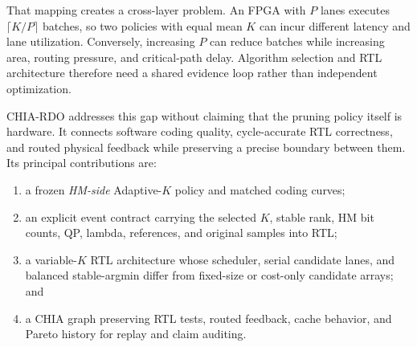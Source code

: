 \documentclass[journal]{IEEEtran}
\newcommand{\project}{\textsc{CHIA-RDO}\xspace}
\begin{document}
That mapping creates a cross-layer problem. An FPGA with $P$ lanes executes
$\lceil K/P\rceil$ batches, so two policies with equal mean $K$ can incur
different latency and lane utilization. Conversely, increasing $P$ can reduce
batches while increasing area, routing pressure, and critical-path delay.
Algorithm selection and RTL architecture therefore need a shared evidence loop
rather than independent optimization.

\project addresses this gap without claiming that the pruning policy itself is
hardware. It connects software coding quality, cycle-accurate RTL correctness,
and routed physical feedback while preserving a precise boundary between them.
Its principal contributions are:
\begin{enumerate}
  \item a frozen \emph{HM-side} Adaptive-$K$ policy and matched coding curves;
  \item an explicit event contract carrying the selected $K$, stable rank,
        HM bit counts, QP, lambda, references, and original samples into RTL;
  \item a variable-$K$ RTL architecture whose scheduler, serial candidate
        lanes, and balanced stable-argmin differ from fixed-size or
        cost-only candidate arrays; and
  \item a CHIA graph preserving RTL tests, routed feedback, cache behavior,
        and Pareto history for replay and claim auditing.
\end{enumerate}
\end{document}
